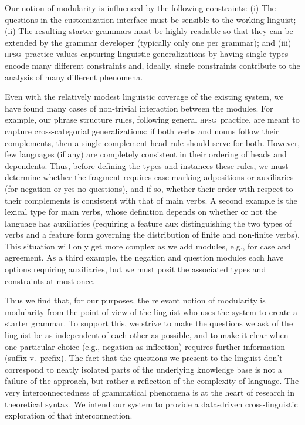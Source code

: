 \documentclass[11pt]{article}
\newcommand{\hpsg}{\textsc{hpsg}}
\begin{document}
Our notion of modularity is influenced by the following constraints:
(i) The questions in the customization interface must be sensible to
the working linguist; (ii) The resulting starter grammars must be
highly readable so that they can be extended by the grammar developer
(typically only one per grammar); and (iii) \hpsg\ practice values capturing linguistic generalizations by having single
types encode many different constraints and, ideally, single
constraints contribute to the analysis of many different phenomena.


Even with the relatively modest linguistic coverage of the existing
system, we have found many cases of non-trivial interaction between
the modules.  For example, our phrase structure rules, following
general \hpsg\ practice, are meant to capture cross-categorial
generalizations: if both verbs and nouns follow their complements,
then a single complement-head rule should serve for both.  However,
few languages (if any) are completely consistent in their ordering of
heads and dependents.  Thus, before defining the types and instances
these rules, we must determine whether the fragment requires
case-marking adpositions or auxiliaries (for negation or yes-no
questions), and if so, whether their order with
respect to their complements is consistent with that of main
verbs.  A second example is the lexical type for
main verbs, whose definition depends on whether or not the language
has auxiliaries (requiring a feature {\sc aux} distinguishing the two
types of verbs and a feature {\sc form} governing the distribution of
finite and non-finite verbs).  This situation will only get
more complex as we add modules, e.g., for case and agreement. As a third
example, the negation and question modules each have options requiring
auxiliaries, but we must posit the associated types and constraints
at most once.

Thus we find that, for our purposes, the relevant notion of modularity
is modularity from the point of view of the linguist who uses the
system to create a starter grammar.  To support this, we strive to
make the questions we ask of the linguist be as independent of each
other as possible, and to make it clear when one particular choice
(e.g., negation as inflection) requires further information (suffix
v.\ prefix).  The fact that the questions we present to
the linguist don't correspond to neatly isolated parts of the
underlying knowledge base is not a failure of the approach, but
rather a reflection of the complexity of language.
The very interconnectedness of
grammatical phenomena is at the heart of research in theoretical
syntax.  We intend our system to provide a data-driven
cross-linguistic exploration of that interconnection.
\end{document}

